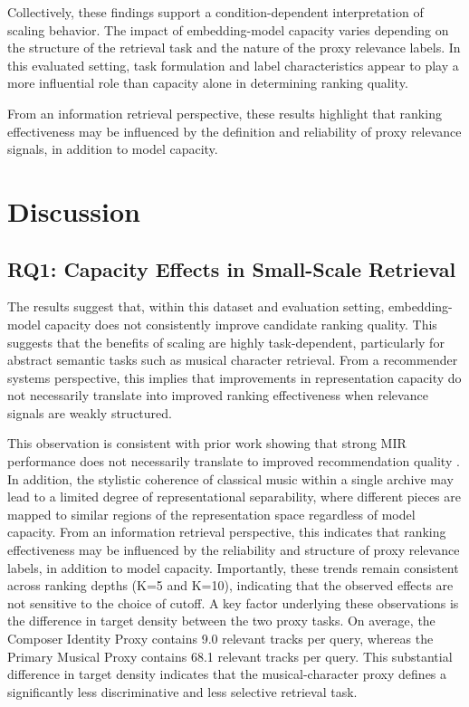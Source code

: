 \documentclass[sigconf]{acmart}
\begin{document}
Collectively, these findings support a condition-dependent interpretation of scaling behavior. The impact of embedding-model capacity varies depending on the structure of the retrieval task and the nature of the proxy relevance labels. In this evaluated setting, task formulation and label characteristics appear to play a more influential role than capacity alone in determining ranking quality. 

From an information retrieval perspective, these results highlight that ranking effectiveness may be influenced by the definition and reliability of proxy relevance signals, in addition to model capacity.

\section{Discussion}

\subsection{RQ1: Capacity Effects in Small-Scale Retrieval}

The results suggest that, within this dataset and evaluation setting, embedding-model capacity does not consistently improve candidate ranking quality. This suggests that the benefits of scaling are highly task-dependent, particularly for abstract semantic tasks such as musical character retrieval. From a recommender systems perspective, this implies that improvements in representation capacity do not necessarily translate into improved ranking effectiveness when relevance signals are weakly structured.

This observation is consistent with prior work showing that strong MIR performance does not necessarily translate to improved recommendation quality \cite{tamm2024}. In addition, the stylistic coherence of classical music within a single archive may lead to a limited degree of representational separability, where different pieces are mapped to similar regions of the representation space regardless of model capacity. From an information retrieval perspective, this indicates that ranking effectiveness may be influenced by the reliability and structure of proxy relevance labels, in addition to model capacity. Importantly, these trends remain consistent across ranking depths (K=5 and K=10), indicating that the observed effects are not sensitive to the choice of cutoff. A key factor underlying these observations is the difference in target density between the two proxy tasks. On average, the Composer Identity Proxy contains 9.0 relevant tracks per query, whereas the Primary Musical Proxy contains 68.1 relevant tracks per query. This substantial difference in target density indicates that the musical-character proxy defines a significantly less discriminative and less selective retrieval task.
\end{document}
